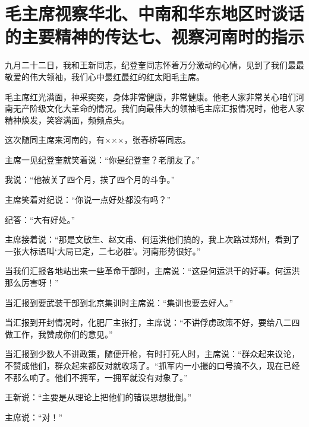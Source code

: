 \section[毛主席视察华北、中南和华东地区时谈话的主要精神的传达七、视察河南时的指示]{毛主席视察华北、中南和华东地区时谈话的主要精神的传达七、视察河南时的指示}


九月二十二日，我和王新同志，纪登奎同志怀着万分激动的心情，见到了我们最最敬爱的伟大领袖，我们心中最红最红的红太阳毛主席。

毛主席红光满面，神采奕奕，身体非常健康，非常健康。他老人家非常关心咱们河南无产阶级文化大革命的情况。我们向最伟大的领袖毛主席汇报情况时，他老人家精神焕发，笑容满面，频频点头。

这次随同主席来河南的，有×××，张春桥等同志。

主席一见纪登奎就笑着说：“你是纪登奎？老朋友了。”

我说：“他被关了四个月，挨了四个月的斗争。”

主席笑着对纪说：“你说一点好处都没有吗？”

纪答：“大有好处。”

主席接着说：“那是文敏生、赵文甫、何运洪他们搞的，我上次路过郑州，看到了一张大标语叫‘大局已定，二七必胜’。河南形势很好。”

当我们汇报各地站出来一些革命干部时，主席说：“这是何运洪干的好事。何运洪那么厉害呀！”

当汇报到要武装干部到北京集训时主席说：“集训也要去好人。”

当汇报到开封情况时，化肥厂主张打，主席说：“不讲俘虏政策不好，要给八二四做工作，我赞成你们的意见。”

当汇报到少数人不讲政策，随便开枪，有时打死人时，主席说：“群众起来议论，不赞成他们，群众起来都反对就收场了。“抓军内一小撮的口号搞不久，现在已经不那么响了。他们不拥军，一拥军就没有对象了。”

王新说：“主要是从理论上把他们的错误思想批倒。”

主席说：“对！”



